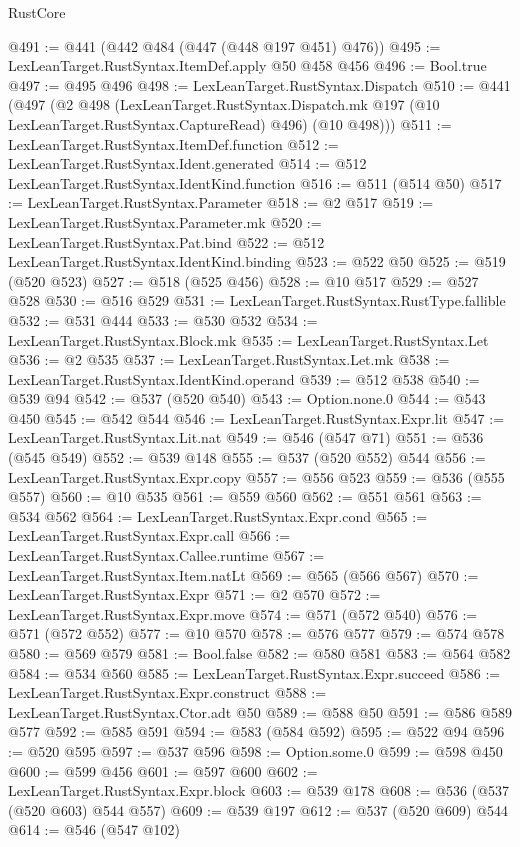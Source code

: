\begin{lexlean}{RustCore}
\begin{coremodule}
@491 := @441 (@442 @484 (@447 (@448 @197 @451) @476))
@495 := LexLeanTarget.RustSyntax.ItemDef.apply @50 @458 @456
@496 := Bool.true
@497 := @495 @496
@498 := LexLeanTarget.RustSyntax.Dispatch
@510 := @441
    (@497
      (@2
        @498
        (LexLeanTarget.RustSyntax.Dispatch.mk @197 (@10 LexLeanTarget.RustSyntax.CaptureRead) @496)
        (@10 @498)))
@511 := LexLeanTarget.RustSyntax.ItemDef.function
@512 := LexLeanTarget.RustSyntax.Ident.generated
@514 := @512 LexLeanTarget.RustSyntax.IdentKind.function
@516 := @511 (@514 @50)
@517 := LexLeanTarget.RustSyntax.Parameter
@518 := @2 @517
@519 := LexLeanTarget.RustSyntax.Parameter.mk
@520 := LexLeanTarget.RustSyntax.Pat.bind
@522 := @512 LexLeanTarget.RustSyntax.IdentKind.binding
@523 := @522 @50
@525 := @519 (@520 @523)
@527 := @518 (@525 @456)
@528 := @10 @517
@529 := @527 @528
@530 := @516 @529
@531 := LexLeanTarget.RustSyntax.RustType.fallible
@532 := @531 @444
@533 := @530 @532
@534 := LexLeanTarget.RustSyntax.Block.mk
@535 := LexLeanTarget.RustSyntax.Let
@536 := @2 @535
@537 := LexLeanTarget.RustSyntax.Let.mk
@538 := LexLeanTarget.RustSyntax.IdentKind.operand
@539 := @512 @538
@540 := @539 @94
@542 := @537 (@520 @540)
@543 := Option.none.{0}
@544 := @543 @450
@545 := @542 @544
@546 := LexLeanTarget.RustSyntax.Expr.lit
@547 := LexLeanTarget.RustSyntax.Lit.nat
@549 := @546 (@547 @71)
@551 := @536 (@545 @549)
@552 := @539 @148
@555 := @537 (@520 @552) @544
@556 := LexLeanTarget.RustSyntax.Expr.copy
@557 := @556 @523
@559 := @536 (@555 @557)
@560 := @10 @535
@561 := @559 @560
@562 := @551 @561
@563 := @534 @562
@564 := LexLeanTarget.RustSyntax.Expr.cond
@565 := LexLeanTarget.RustSyntax.Expr.call
@566 := LexLeanTarget.RustSyntax.Callee.runtime
@567 := LexLeanTarget.RustSyntax.Item.natLt
@569 := @565 (@566 @567)
@570 := LexLeanTarget.RustSyntax.Expr
@571 := @2 @570
@572 := LexLeanTarget.RustSyntax.Expr.move
@574 := @571 (@572 @540)
@576 := @571 (@572 @552)
@577 := @10 @570
@578 := @576 @577
@579 := @574 @578
@580 := @569 @579
@581 := Bool.false
@582 := @580 @581
@583 := @564 @582
@584 := @534 @560
@585 := LexLeanTarget.RustSyntax.Expr.succeed
@586 := LexLeanTarget.RustSyntax.Expr.construct
@588 := LexLeanTarget.RustSyntax.Ctor.adt @50
@589 := @588 @50
@591 := @586 @589 @577
@592 := @585 @591
@594 := @583 (@584 @592)
@595 := @522 @94
@596 := @520 @595
@597 := @537 @596
@598 := Option.some.{0}
@599 := @598 @450
@600 := @599 @456
@601 := @597 @600
@602 := LexLeanTarget.RustSyntax.Expr.block
@603 := @539 @178
@608 := @536 (@537 (@520 @603) @544 @557)
@609 := @539 @197
@612 := @537 (@520 @609) @544
@614 := @546 (@547 @102)

\end{coremodule}
\end{lexlean}
